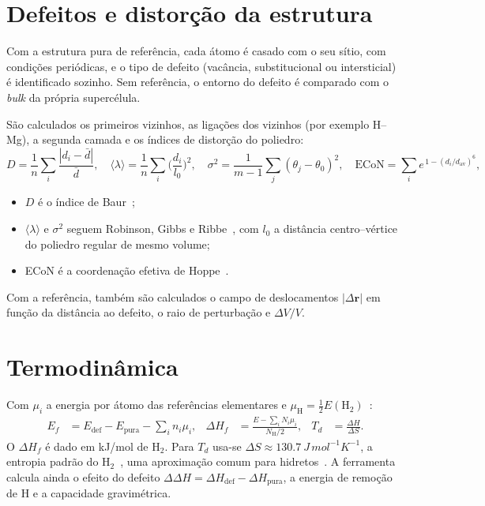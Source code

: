 \documentclass[11pt,a4paper]{article}
\begin{document}
\section{Defeitos e distorção da estrutura}
Com a estrutura pura de referência, cada átomo é casado com o seu sítio, com condições periódicas, e o tipo de defeito (vacância, substitucional ou intersticial) é identificado sozinho. Sem referência, o entorno do defeito é comparado com o \textit{bulk} da própria supercélula.

São calculados os primeiros vizinhos, as ligações dos vizinhos (por exemplo H--Mg), a segunda camada e os índices de distorção do poliedro:
\begin{equation}
D=\frac1n\sum_i\frac{|d_i-\bar d|}{\bar d},\quad
\langle\lambda\rangle=\frac1n\sum_i\Big(\frac{d_i}{l_0}\Big)^{2},\quad
\sigma^2=\frac{1}{m-1}\sum_j(\theta_j-\theta_0)^2,\quad
\mathrm{ECoN}=\sum_i e^{\,1-(d_i/d_{\mathrm{av}})^6},
\end{equation}
\begin{itemize}
  \item $D$ é o índice de Baur~\cite{baur1974};
  \item $\langle\lambda\rangle$ e $\sigma^2$ seguem Robinson, Gibbs e Ribbe~\cite{robinson1971}, com $l_0$ a distância centro--vértice do poliedro regular de mesmo volume;
  \item ECoN é a coordenação efetiva de Hoppe~\cite{hoppe1979}.
\end{itemize}
Com a referência, também são calculados o campo de deslocamentos $|\Delta\mathbf r|$ em função da distância ao defeito, o raio de perturbação e $\Delta V/V$.

\section{Termodinâmica}
Com $\mu_i$ a energia por átomo das referências elementares e $\mu_\mathrm{H}=\tfrac12E(\mathrm{H}_2)$~\cite{freysoldt2014,vandewalle2004}:
\begin{align}
E_f&=E_\mathrm{def}-E_\mathrm{pura}-\sum_i n_i\mu_i, &
\Delta H_f&=\frac{E-\sum_i N_i\mu_i}{N_\mathrm{H}/2}, &
T_d&=\frac{\Delta H}{\Delta S}.
\end{align}
O $\Delta H_f$ é dado em kJ/mol de H$_2$. Para $T_d$ usa-se $\Delta S\approx\SI{130.7}{J\,mol^{-1}K^{-1}}$, a entropia padrão do H$_2$~\cite{chase1998janaf}, uma aproximação comum para hidretos~\cite{sakintuna2007}. A ferramenta calcula ainda o efeito do defeito $\Delta\Delta H=\Delta H_\mathrm{def}-\Delta H_\mathrm{pura}$, a energia de remoção de H e a capacidade gravimétrica.
\end{document}
